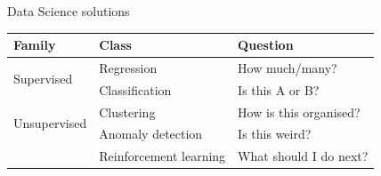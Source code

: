 \begin{frame}{Data Science solutions}
    \begin{center}
        \begin{tabular}{lll}
            \toprule
            \textbf{Family}               & \textbf{Class}         & \textbf{Question} \\
            \midrule
            \multirow{2}{*}{Supervised}   & Regression             & How much/many? \\
                                          & Classification         & Is this A or B? \\
            \midrule
            \multirow{2}{*}{Unsupervised} & Clustering             & How is this organised? \\
                                          & Anomaly detection      & Is this weird? \\
            \midrule
                                          & Reinforcement learning & What should I do next? \\
            \bottomrule
        \end{tabular}
    \end{center}
\end{frame}



